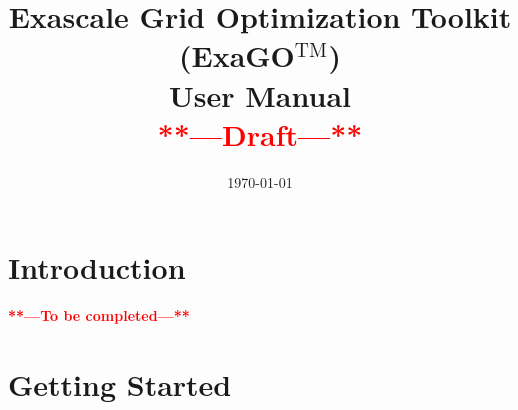 \documentclass[11pt]{report}
\newcommand{\todo}{\textbf{{\textcolor{red}{\Large{**---To be completed---**}}}}}
\begin{document}
\title{\textbf{Exascale Grid Optimization Toolkit (ExaGO$\mathrm{{}^{TM}}$)} \\ \textbf{User Manual} \\ \textbf{{\textcolor{red}{**---Draft---**}}}}
\author{}

\date{\today}
\maketitle

\tableofcontents

\newpage




\chapter{Introduction}\label{chap:intro}
\todo

\chapter{Getting Started}\label{chap:getting_started}













\begin{appendices}



\end{appendices}



\end{document}
